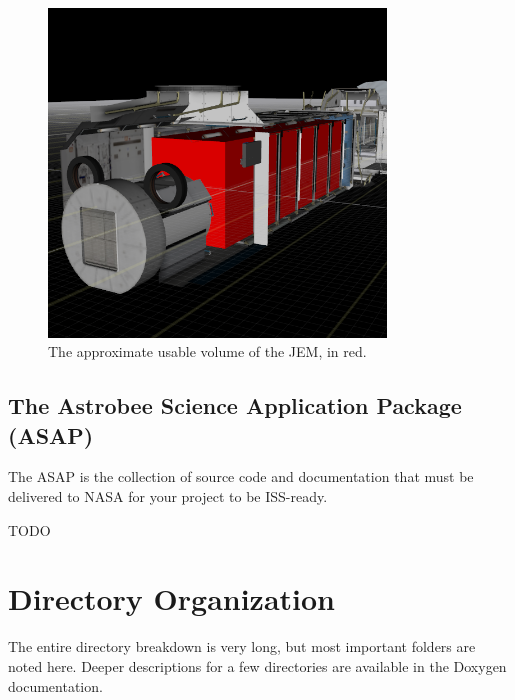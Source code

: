 \documentclass{article}
\begin{document}
\begin{figure}[h!]
	\centering
	\includegraphics[width=0.8\textwidth]{img/ISS_volume.png}
	\caption{The approximate usable volume of the JEM, in red.}
\end{figure}


\subsection{The Astrobee Science Application Package (ASAP)}

The ASAP is the collection of source code and documentation that must be delivered to NASA for your project to be ISS-ready.

TODO



\newpage

\appendix
\section{Directory Organization}

The entire directory breakdown is very long, but most important folders are noted here. Deeper descriptions for a few directories are available in the Doxygen documentation.\\
\end{document}
